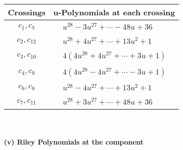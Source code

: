 \documentclass[1p]{elsarticle_modified}
\theoremstyle{definition}
\begin{document}
\begin{tabular}{m{50pt}|m{274pt}}
Crossings & \hspace{64pt}u-Polynomials at each crossing \\
\hline $$\begin{aligned}c_{1},c_{5}\end{aligned}$$&$\begin{aligned}
&u^{28}-3 u^{27}+\cdots-48 u+36
\end{aligned}$\\
\hline $$\begin{aligned}c_{2},c_{12}\end{aligned}$$&$\begin{aligned}
&u^{28}+4 u^{27}+\cdots+13 u^2+1
\end{aligned}$\\
\hline $$\begin{aligned}c_{3},c_{10}\end{aligned}$$&$\begin{aligned}
&4(4 u^{28}+4 u^{27}+\cdots+3 u+1)
\end{aligned}$\\
\hline $$\begin{aligned}c_{4},c_{9}\end{aligned}$$&$\begin{aligned}
&4(4 u^{28}-4 u^{27}+\cdots-3 u+1)
\end{aligned}$\\
\hline $$\begin{aligned}c_{6},c_{8}\end{aligned}$$&$\begin{aligned}
&u^{28}-4 u^{27}+\cdots+13 u^2+1
\end{aligned}$\\
\hline $$\begin{aligned}c_{7},c_{11}\end{aligned}$$&$\begin{aligned}
&u^{28}+3 u^{27}+\cdots+48 u+36
\end{aligned}$\\
\hline
\end{tabular}\\~\\
\newpage\renewcommand{\arraystretch}{1}
\flushleft \textbf{(v) Riley Polynomials at the component}\newline \\
\end{document}
